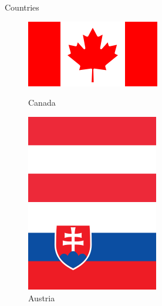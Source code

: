 \begin{frame}{Countries}
\begin{figure}[!ht]
\centering

\begin{minipage}{.24\textwidth}
\centering
\includegraphics[width=1\linewidth]{img/countries/canada.png}
\caption{Canada}
\end{minipage}
\begin{minipage}{.24\textwidth}
\centering
\includegraphics[width=0.8\linewidth]{img/countries/austria.png}
\caption{Austria}
\end{minipage}
\begin{minipage}{.24\textwidth}
\centering
\includegraphics[width=0.8\linewidth]{img/countries/slovakia.png}

\end{minipage}
\end{figure}
\end{frame}
